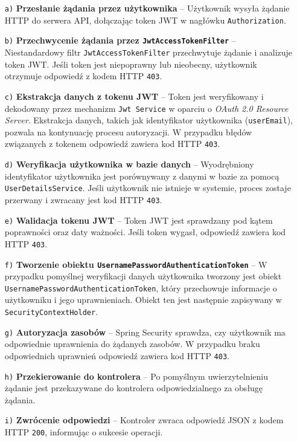 \begin{enumerate}
    \item[\texttt{a)}] \textbf{Przesłanie żądania przez użytkownika} -- Użytkownik wysyła żądanie HTTP do serwera API, dołączając token JWT w nagłówku \texttt{Authorization}.
    
    \item[\texttt{b)}] \textbf{Przechwycenie żądania przez \texttt{JwtAccessTokenFilter}} -- Niestandardowy filtr \texttt{JwtAccessTokenFilter} przechwytuje żądanie i analizuje token JWT. Jeśli token jest niepoprawny lub nieobecny, użytkownik otrzymuje odpowiedź z kodem HTTP \texttt{403}.
    
    \item[\texttt{c)}] \textbf{Ekstrakcja danych z tokenu JWT} -- Token jest weryfikowany i dekodowany przez mechanizm \texttt{Jwt Service} w oparciu o \emph{OAuth 2.0 Resource Server}. Ekstrakcja danych, takich jak identyfikator użytkownika (\texttt{userEmail}), pozwala na kontynuację procesu autoryzacji. W przypadku błędów związanych z tokenem odpowiedź zawiera kod HTTP \texttt{403}.
    
    \item[\texttt{d)}] \textbf{Weryfikacja użytkownika w bazie danych} -- Wyodrębniony identyfikator użytkownika jest porównywany z danymi w bazie za pomocą \texttt{UserDetailsService}. Jeśli użytkownik nie istnieje w systemie, proces zostaje przerwany i zwracany jest kod HTTP \texttt{403}.
    
    \item[\texttt{e)}] \textbf{Walidacja tokenu JWT} -- Token JWT jest sprawdzany pod kątem poprawności oraz daty ważności. Jeśli token wygasł, odpowiedź zawiera kod HTTP \texttt{403}.
    
    \item[\texttt{f)}] \textbf{Tworzenie obiektu \texttt{UsernamePasswordAuthenticationToken}} -- W przypadku pomyślnej weryfikacji danych użytkownika tworzony jest obiekt \texttt{UsernamePasswordAuthenticationToken}, który przechowuje informacje o użytkowniku i jego uprawnieniach. Obiekt ten jest następnie zapisywany w \texttt{SecurityContextHolder}.
    
    \item[\texttt{g)}] \textbf{Autoryzacja zasobów} -- Spring Security sprawdza, czy użytkownik ma odpowiednie uprawnienia do żądanych zasobów. W przypadku braku odpowiednich uprawnień odpowiedź zawiera kod HTTP \texttt{403}.
    
    \item[\texttt{h)}] \textbf{Przekierowanie do kontrolera} -- Po pomyślnym uwierzytelnieniu żądanie jest przekazywane do kontrolera odpowiedzialnego za obsługę żądania.
    
    \item[\texttt{i)}] \textbf{Zwrócenie odpowiedzi} -- Kontroler zwraca odpowiedź JSON z kodem HTTP \texttt{200}, informując o sukcesie operacji.
\end{enumerate}

